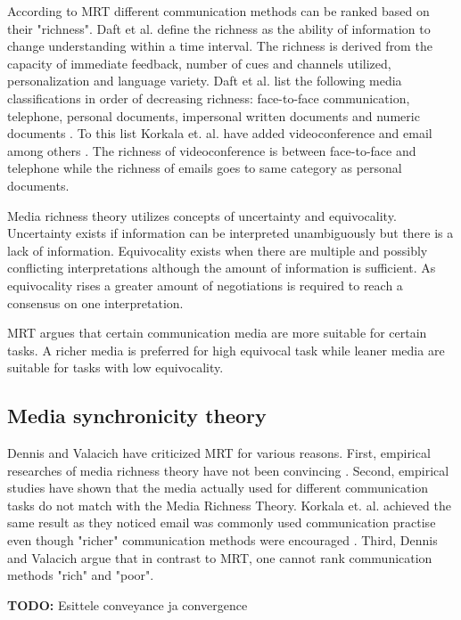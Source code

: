 \documentclass[conference]{IEEEtran}
\begin{document}
According to MRT different communication methods can be ranked based on their "richness". Daft et al. define the richness as the ability of information to change understanding within a time interval. The richness is derived from the capacity of immediate feedback, number of cues and channels utilized, personalization and language variety. Daft et al. list the following media classifications in order of decreasing richness: face-to-face communication, telephone, personal documents, impersonal written documents and numeric documents \cite{1986daft}. To this list Korkala et. al. have added videoconference and email among others \cite{2006korkala}. The richness of videoconference is between face-to-face and telephone while the richness of emails goes to same category as personal documents.

Media richness theory utilizes concepts of uncertainty and equivocality. Uncertainty exists if information can be interpreted unambiguously but there is a lack of information. Equivocality exists when there are multiple and possibly conflicting interpretations although the amount of information is sufficient. As equivocality rises a greater amount of negotiations is required to reach a consensus on one interpretation. \cite{1999dennis}

MRT argues that certain communication media are more suitable for certain tasks. A richer media is preferred for high equivocal task while leaner media are suitable for tasks with low equivocality. 

\subsection{Media synchronicity theory}

Dennis and Valacich have criticized MRT for various reasons. First, empirical researches of media richness theory have not been convincing \cite{1998dennis} \cite{1997elshinnawy}. Second, empirical studies have shown that the media actually used for different communication tasks do not match with the Media Richness Theory. Korkala et. al. achieved the same result as they noticed email was commonly used communication practise even though "richer" communication methods were encouraged \cite{2006korkala}. Third, Dennis and Valacich argue that in contrast to MRT, one cannot rank communication methods "rich" and "poor". \cite{1999dennis}

\textbf{TODO:} Esittele conveyance ja convergence
\end{document}
